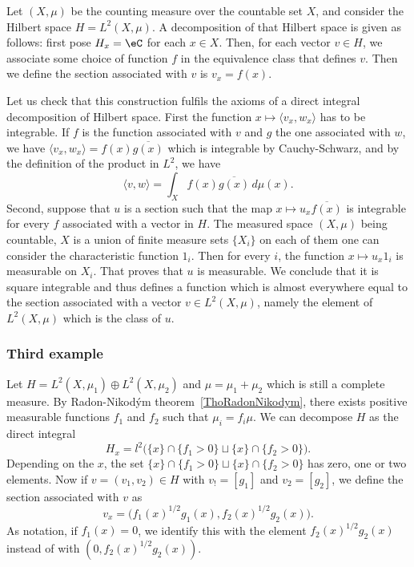 Let $(X,\mu)$ be the counting measure over the countable set $X$, and consider the Hilbert space $H=L^2(X,\mu)$. A decomposition of that Hilbert space is given as follows: first pose $H_x=\eC$ for each $x\in X$. Then, for each vector $v\in H$, we associate some choice of function $f$ in the equivalence class that defines $v$. Then we define the section associated with $v$ is $v_x=f(x)$.

Let us check that this construction fulfils the axioms of a direct integral decomposition of Hilbert space. First the function $x\mapsto \langle v_x, w_x\rangle $ has to be integrable. If $f$ is the function associated with $v$ and $g$ the one associated with $w$, we have $\langle v_x, w_x\rangle =f(x)\overline{ g(x) }$ which is integrable by Cauchy-Schwarz, and by the definition of the product in $L^2$, we have
\begin{equation}
	\langle v, w\rangle =\int_X f(x)\overline{ g(x) }\,d\mu(x).
\end{equation}
Second, suppose that $u$ is a section such that the map $x\mapsto u_x\overline{ f(x) }$ is integrable for every $f$ associated with a vector in $H$. The measured space $(X,\mu)$ being countable, $X$ is a union of finite measure sets $\{ X_i \}$ on each of them one can consider the characteristic function $1_i$. Then for every $i$, the function $x\mapsto u_x 1_i$ is measurable on $X_i$. That proves that $u$ is measurable. We conclude that it is square integrable and thus defines a function which is almost everywhere equal to the section associated with a vector $v\in L^2(X,\mu)$, namely the element of $L^2(X,\mu)$ which is the class of $u$.

					\subsubsection{Third example}

Let $H=L^2(X,\mu_1)\oplus L^2(X,\mu_2)$ and $\mu=\mu_1+\mu_2$ which is still a complete measure. By Radon-Nikod\'ym theorem~\ref{ThoRadonNikodym}, there exists positive measurable functions $f_1$ and $f_2$ such that $\mu_i=f_i\mu$. We can decompose $H$ as the direct integral
\begin{equation}
	H_x=l^2\Big(    \{ x \}\cap\{ f_1>0 \}\sqcup \{ x \}\cap\{ f_2>0 \}  \Big).
\end{equation}
Depending on the $x$, the set $\{ x \}\cap\{ f_1>0 \}\sqcup \{ x \}\cap\{ f_2>0 \}$ has zero, one or two elements. Now if $v=(v_1,v_2)\in H$ with $v_!=[g_1]$ and $v_2=[g_2]$, we define the section associated with $v$ as
\begin{equation}
	v_x=\big( f_1(x)^{1/2}g_1(x),f_2(x)^{1/2}g_2(x) \big).
\end{equation}
As notation, if $f_1(x)=0$, we identify this with the element $f_2(x)^{1/2}g_2(x)$ instead of with $(0,f_2(x)^{1/2}g_2(x))$.

